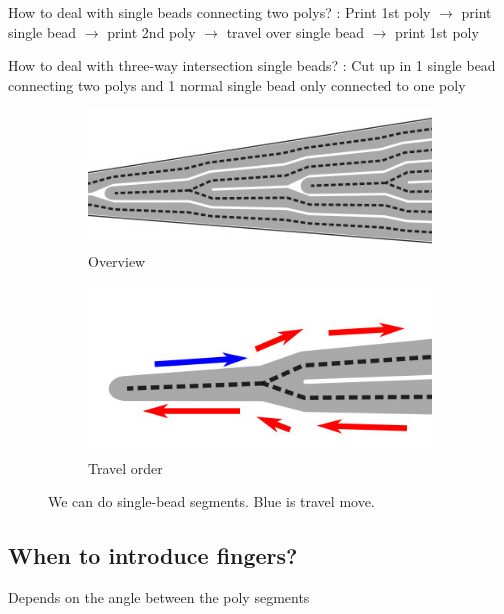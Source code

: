 How to deal with single beads connecting two polys?
: Print 1st poly $\to$ print single bead $\to$ print 2nd poly $\to$ travel over single bead $\to$ print 1st poly

How to deal with three-way intersection single beads?
: Cut up in 1 single bead connecting two polys and 1 normal single bead only connected to one poly

\begin{figure}[H]
\begin{subfigure}{0.45\columnwidth}
\includegraphics[width=\columnwidth]{sources/method/single_bead_strategy.jpg}
\caption{Overview}
\label{single_bead_strategy_overview}
\end{subfigure}
\begin{subfigure}{0.45\columnwidth}
\includegraphics[width=\columnwidth]{sources/method/single_bead_strategy_order.jpg}
\caption{Travel order}
\end{subfigure}
\caption{We can do single-bead segments. Blue is travel move.}
\label{single_bead_strategy}
\end{figure}


\subsection{When to introduce fingers?}
Depends on the angle between the poly segments

